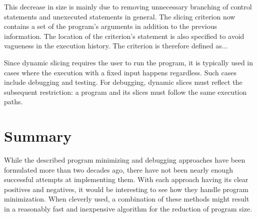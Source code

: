 This decrease in size is mainly due to removing unnecessary 
branching of control statements and unexecuted statements in general. 
The slicing criterion now contains a set of the program's 
arguments in addition to the previous information. 
The location of the criterion's statement is also specified to avoid 
vagueness in the execution history. 
The criterion is therefore defined as... 

\lipsum[11]

Since dynamic slicing requires the user to run the program, 
it is typically used in cases where the execution with a fixed 
input happens regardless. Such cases include debugging and testing. 
For debugging, dynamic slices must reflect the subsequent restriction: 
a program and its slices must follow the same execution paths.

\section{Summary}

While the described program minimizing and debugging approaches have been 
formulated more than two decades ago, there have not been nearly enough 
successful attempts at implementing them. 
With each approach having its clear positives and negatives, 
it would be interesting to see how they handle program minimization. 
When cleverly used, a combination of these methods might 
result in a reasonably fast and inexpensive algorithm 
for the reduction of program size.